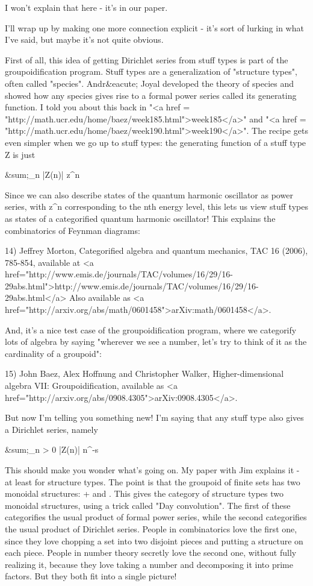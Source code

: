 I won't explain that here - it's in our paper. 

I'll wrap up by making one more connection explicit - it's sort of
lurking in what I've said, but maybe it's not quite obvious.

First of all, this idea of getting Dirichlet series from stuff types
is part of the groupoidification program.  Stuff types are a
generalization of "structure types", often called "species".
Andr&eacute; Joyal developed the theory of species and showed how any
species gives rise to a formal power series called its generating
function.  I told you about this back in "<a href =
"http://math.ucr.edu/home/baez/week185.html">week185</a>" and
"<a href =
"http://math.ucr.edu/home/baez/week190.html">week190</a>".  The
recipe gets even simpler when we go up to stuff types: the generating
function of a stuff type Z is just

&sum;_{n } |Z(n)| z^{n}

Since we can also describe states of the quantum harmonic oscillator
as power series, with z^{n} corresponding to the nth energy
level, this lets us view stuff types as states of a categorified
quantum harmonic oscillator! This explains the combinatorics of
Feynman diagrams:

14) Jeffrey Morton, Categorified algebra and quantum mechanics, TAC 16
(2006), 785-854, available at <a
href="http://www.emis.de/journals/TAC/volumes/16/29/16-29abs.html">http://www.emis.de/journals/TAC/volumes/16/29/16-29abs.html</a>
Also available as <a
href="http://arxiv.org/abs/math/0601458">arXiv:math/0601458</a>.

And, it's a nice test case of the groupoidification program, where we
categorify lots of algebra by saying "wherever we see a number, let's
try to think of it as the cardinality of a groupoid":

15) John Baez, Alex Hoffnung and Christopher Walker,
Higher-dimensional algebra VII: Groupoidification, available as <a
href="http://arxiv.org/abs/0908.4305">arXiv:0908.4305</a>.

But now I'm telling you something new!  I'm saying that any stuff type
also gives a Dirichlet series, namely

&sum;_{n > 0} |Z(n)| n^{-s}

This should make you wonder what's going on.  My paper with Jim
explains it - at least for structure types.  The point is that the
groupoid of finite sets has two monoidal structures: + and \times .
This gives the category of structure types two monoidal structures,
using a trick called "Day convolution".  The first of these
categorifies the usual product of formal power series, while the
second categorifies the usual product of Dirichlet series.  People in
combinatorics love the first one, since they love chopping a set into
two disjoint pieces and putting a structure on each piece.  People in
number theory secretly love the second one, without fully realizing
it, because they love taking a number and decomposing it into prime
factors.  But they both fit into a single picture!

